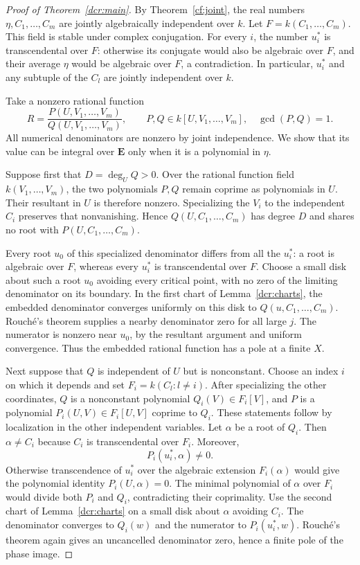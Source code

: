 \documentclass[11pt]{article}
\theoremstyle{definition}
\theoremstyle{remark}
\newcommand{\E}{\mathbf E}
\begin{document}
\begin{proof}[Proof of Theorem~\ref{dcr:main}]
By Theorem~\ref{cf:joint}, the real numbers $\eta,C_1,\ldots,C_m$
are jointly algebraically independent over $k$. Let
$F=k(C_1,\ldots,C_m)$. This field is stable under complex conjugation.
For every $i$, the number $u_i^*$ is transcendental over $F$: otherwise
its conjugate would also be algebraic over $F$, and their average
$\eta$ would be algebraic over $F$, a contradiction. In particular,
$u_i^*$ and any subtuple of the $C_l$ are jointly independent over $k$.

Take a nonzero rational function
\[
 R=\frac{P(U,V_1,\ldots,V_m)}{Q(U,V_1,\ldots,V_m)},\qquad
 P,Q\in k[U,V_1,\ldots,V_m],\quad \gcd(P,Q)=1.
\]
All numerical denominators are nonzero by joint independence. We show
that its value can be integral over $\E$ only when it is a polynomial
in $\eta$.

Suppose first that $D=\deg_U Q>0$. Over the rational function field
$k(V_1,\ldots,V_m)$, the two polynomials $P,Q$ remain coprime as
polynomials in $U$. Their resultant in $U$ is therefore nonzero.
Specializing the $V_i$ to the independent $C_i$ preserves that
nonvanishing. Hence $Q(U,C_1,\ldots,C_m)$ has degree $D$ and shares
no root with $P(U,C_1,\ldots,C_m)$.

Every root $u_0$ of this specialized denominator differs from all the
$u_i^*$: a root is algebraic over $F$, whereas every $u_i^*$ is
transcendental over $F$. Choose a small disk about such a root $u_0$
avoiding every critical point, with no zero of the limiting denominator
on its boundary. In the first chart of Lemma~\ref{dcr:charts}, the
embedded denominator converges uniformly on this disk to
$Q(u,C_1,\ldots,C_m)$. Rouch\'e's theorem supplies a nearby denominator
zero for all large $j$. The numerator is nonzero near $u_0$, by the
resultant argument and uniform convergence. Thus the embedded rational
function has a pole at a finite $X$.

Next suppose that $Q$ is independent of $U$ but is nonconstant. Choose
an index $i$ on which it depends and set $F_i=k(C_l:l\ne i)$. After
specializing the other coordinates, $Q$ is a nonconstant polynomial
$Q_i(V)\in F_i[V]$, and $P$ is a polynomial $P_i(U,V)\in F_i[U,V]$
coprime to $Q_i$. These statements follow by localization in the other
independent variables. Let $\alpha$ be a root of $Q_i$. Then
$\alpha\ne C_i$ because $C_i$ is transcendental over $F_i$.
Moreover,
\[
                       P_i(u_i^*,\alpha)\ne0.
\]
Otherwise transcendence of $u_i^*$ over the algebraic extension
$F_i(\alpha)$ would give the polynomial identity $P_i(U,\alpha)=0$.
The minimal polynomial of $\alpha$ over $F_i$ would divide both $P_i$
and $Q_i$, contradicting their coprimality.
Use the second chart of Lemma~\ref{dcr:charts} on a small disk about
$\alpha$ avoiding $C_i$. The denominator converges to $Q_i(w)$ and
the numerator to $P_i(u_i^*,w)$. Rouch\'e's theorem again gives an
uncancelled denominator zero, hence a finite pole of the phase image.


\end{proof}
\end{document}
